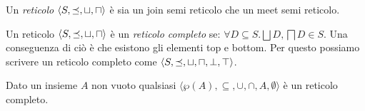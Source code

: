 \begin{definition}[Reticolo]
Un \textit{reticolo} \(\langle S, \preceq,\sqcup, \sqcap\rangle\) è sia un join semi reticolo che un meet semi reticolo.
\end{definition}

\begin{definition}
Un reticolo \(\langle S, \preceq,\sqcup, \sqcap\rangle\) è un \textit{reticolo completo} se: \(\forall D\subseteq S.\bigsqcup D,\bigsqcap D\in S\). Una conseguenza di ciò è che esistono gli elementi top e bottom. Per questo possiamo scrivere un reticolo completo come \(\langle S, \preceq,\sqcup, \sqcap, \perp, \top\rangle\).
\end{definition}

\begin{example}
Dato un insieme \(A\) non vuoto qualsiasi \(\langle\wp(A), \subseteq, \cup, \cap, A, \emptyset\rangle\) è un reticolo completo.
\end{example}

